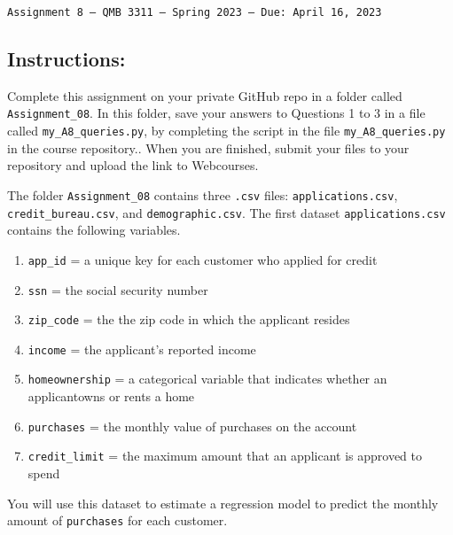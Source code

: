 \documentclass[11pt]{exam}
\begin{document}
\texttt{Assignment 8 --- QMB 3311 ---  Spring 2023  --- Due: April 16, 2023}

\subsection*{Instructions:}

Complete this assignment on your private GitHub repo in a folder called \texttt{Assignment\_08}. In this folder, save your answers to Questions 1 to 3 in a file called \texttt{my\_A8\_queries.py}, by completing the script in the file \texttt{my\_A8\_queries.py} in the course repository.. When you are finished, submit your files to your repository and upload the link to Webcourses.

    \begin{questions}

\question The folder \texttt{Assignment\_08} contains three \texttt{.csv} files: \texttt{applications.csv}, \texttt{credit\_bureau.csv}, and \texttt{demographic.csv}. The first dataset \texttt{applications.csv} contains the following variables.

\begin{enumerate}
\item \texttt{app\_id} = a unique key for each customer who applied for credit
\item \texttt{ssn} = the social security number
\item \texttt{zip\_code} = the the zip code in which the applicant resides
\item \texttt{income} = the applicant's reported income
\item \texttt{homeownership} = a categorical variable that indicates whether an applicantowns or rents a home
\item \texttt{purchases} = the monthly value of purchases on the account
\item \texttt{credit\_limit} = the maximum amount that an applicant is approved to spend
\end{enumerate}

You will use this dataset to estimate a regression model to predict the monthly amount of \texttt{purchases} for each customer.

\end{questions}
\end{document}
